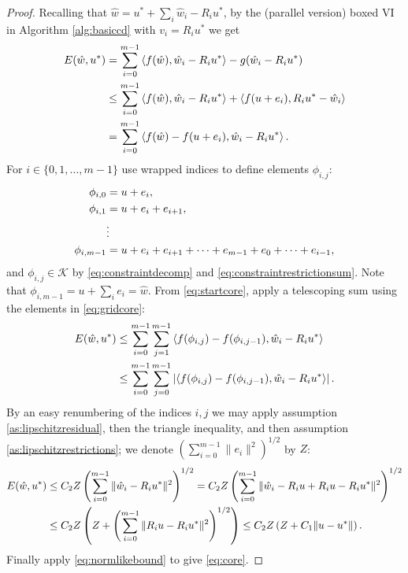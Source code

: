 \documentclass[letterpaper,final,12pt,reqno]{amsart}
\theoremstyle{cstyle}
\theoremstyle{cstyle*}
\theoremstyle{dstyle}
\numberwithin{equation}{section}
\numberwithin{figure}{section}
\numberwithin{table}{section}
\numberwithin{theorem}{section}
\newcommand{\cK}{\mathcal{K}}
\newcommand{\ip}[2]{\left<#1,#2\right>}
\begin{document}
\begin{proof}  Recalling that $\hat w = u^* + \sum_i \hat w_i - R_i u^*$, by the (parallel version) boxed VI in Algorithm \ref{alg:basiccd} with $v_i = R_i u^*$ we get
\begin{align}
E(\hat w,u^*) &= \sum_{i=0}^{m-1} \ip{f(\hat w)}{\hat w_i - R_i u^*} - g(\hat w_i - R_i u^*) \label{eq:startcore} \\
    &\le \sum_{i=0}^{m-1} \ip{f(\hat w)}{\hat w_i - R_i u^*} + \ip{f(u + e_i)}{R_i u^* - \hat w_i} \notag \\
    &= \sum_{i=0}^{m-1} \ip{f(\hat w) - f(u + e_i)}{\hat w_i - R_i u^*}. \notag
\end{align}
For $i\in \{0,1,\dots,m-1\}$ use wrapped indices to define elements $\phi_{i,j}$:
\begin{align}
\phi_{i,0} &= u + e_i, \label{eq:gridcore} \\
\phi_{i,1} &= u + e_i + e_{i+1}, \notag \\
  &\vdots \notag \\
\phi_{i,m-1} &= u + e_i + e_{i+1} + \dots + e_{m-1} + e_0 + \dots + e_{i-1}, \notag
\end{align}
and $\phi_{i,j} \in \cK$ by \eqref{eq:constraintdecomp} and \eqref{eq:constraintrestrictionsum}.  Note that $\phi_{i,m-1} = u + \sum_i e_i = \hat w$.  From \eqref{eq:startcore}, apply a telescoping sum using the elements in \eqref{eq:gridcore}:
\begin{align}
E(\hat w,u^*) &\le \sum_{i=0}^{m-1} \sum_{j=1}^{m-1} \ip{f(\phi_{i,j}) - f(\phi_{i,j-1})}{\hat w_i - R_i u^*} \label{eq:nextcore} \\
  &\le \sum_{i=0}^{m-1} \sum_{j=0}^{m-1} \left|\ip{f(\phi_{i,j}) - f(\phi_{i,j-1})}{\hat w_i - R_i u^*}\right|. \notag
\end{align}
By an easy renumbering of the indices $i,j$ we may apply assumption \eqref{as:lipschitzresidual}, then the triangle inequality, and then assumption \eqref{as:lipschitzrestrictions}; we denote $\left(\sum_{i=0}^{m-1} \|e_i\|^2\right)^{1/2}$ by $Z$:
\begin{align}
E(\hat w,u^*) &\le C_2 Z \left(\sum_{i=0}^{m-1} \|\hat w_i - R_i u^*\|^2\right)^{1/2} = C_2 Z \left(\sum_{i=0}^{m-1} \|\hat w_i - R_i u + R_i u - R_i u^*\|^2\right)^{1/2} \label{eq:nextnextcore} \\
  &\le C_2 Z \left(Z + \left(\sum_{i=0}^{m-1} \|R_i u - R_i u^*\|^2\right)^{1/2}\right) \le C_2 Z \left(Z + C_1 \|u-u^*\|\right). \notag
\end{align}
Finally apply \eqref{eq:normlikebound} to give \eqref{eq:core}.
\end{proof}
\end{document}
